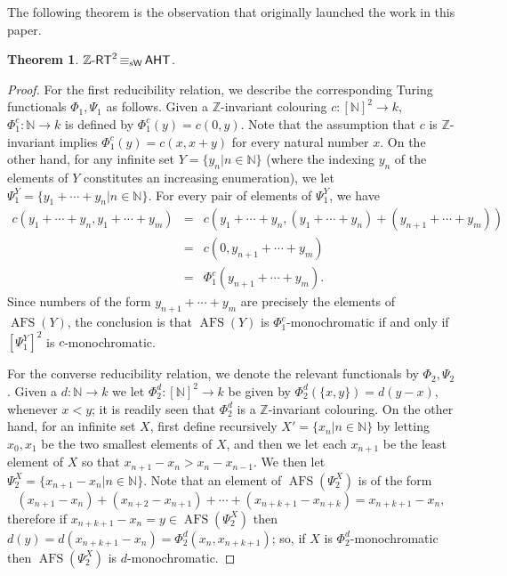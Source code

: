 \documentclass[11pt]{amsart}
\newcommand{\zrt}{\mathnormal{\mathbb Z\text{-}\mathsf{RT}}}
\newcommand{\aht}{\mathnormal{\mathsf{AHT}}}
\newcommand{\weiseq}{\mathop{\equiv_{\mathrm{s}\mathsf{W}}}}
\DeclareMathOperator{\afs}{AFS}
\newtheorem{theorem}{Theorem}%
\theoremstyle{definition}
\begin{document}
The following theorem is the observation that originally launched the work in this paper.

\begin{theorem}\label{zrtversusaht}
$\zrt^2\weiseq\aht$.
\end{theorem}

\begin{proof}
For the first reducibility relation, we describe the corresponding Turing functionals $\Phi_1,\Psi_1$ as follows.
Given a $\mathbb Z$-invariant colouring $c:[\mathbb N]^2\longrightarrow k$, $\Phi_1^c:\mathbb N\longrightarrow k$ is defined by $\Phi_1^c(y)=c(0,y)$. Note that the assumption that $c$ is $\mathbb Z$-invariant implies $\Phi_1^c(y)=c(x,x+y)$ for every natural number $x$. On the other hand, for any infinite set $Y=\{y_n\big|n\in\mathbb N\}$ (where the indexing $y_n$ of the elements of $Y$ constitutes an increasing enumeration), we let $\Psi_1^Y=\{y_1+\cdots+y_n\big|n\in\mathbb N\}$. For every pair of elements of $\Psi_1^Y$, we have
\begin{eqnarray*}
c(y_1+\cdots+y_n,y_1+\cdots+y_m) & = & c(y_1+\cdots+y_n,(y_1+\cdots+y_n)+(y_{n+1}+\cdots+y_m)) \\
 & = & c(0,y_{n+1}+\cdots+y_m) \\
 & = & \Phi_1^c(y_{n+1}+\cdots+y_m).
\end{eqnarray*}
Since numbers of the form $y_{n+1}+\cdots+y_m$ are precisely the elements of $\afs(Y)$, the conclusion is that $\afs(Y)$ is $\Phi_1^c$-monochromatic if and only if $[\Psi_1^Y]^2$ is $c$-monochromatic.

For the converse reducibility relation, we denote the relevant functionals by $\Phi_2,\Psi_2$. Given a $d:\mathbb N\longrightarrow k$ we let $\Phi_2^d:[\mathbb N]^2\longrightarrow k$ be given by $\Phi_2^d(\{x,y\})=d(y-x)$, whenever $x<y$; it is readily seen that $\Phi_2^d$ is a $\mathbb Z$-invariant colouring. On the other hand, for an infinite set $X$, first define recursively $X'=\{x_n\big|n\in\mathbb N\}$ by letting $x_0,x_1$ be the two smallest elements of $X$, and then we let each $x_{n+1}$ be the least element of $X$ so that $x_{n+1}-x_n>x_n-x_{n-1}$. We then let $\Psi_2^X=\{x_{n+1}-x_n\big|n\in\mathbb N\}$. Note that an element of $\afs(\Psi_2^X)$ is of the form
\begin{equation*}
(x_{n+1}-x_n)+(x_{n+2}-x_{n+1})+\cdots+(x_{n+k+1}-x_{n+k})=x_{n+k+1}-x_n,
\end{equation*}
therefore if $x_{n+k+1}-x_n=y\in\afs(\Psi_2^X)$ then $d(y)=d(x_{n+k+1}-x_n)=\Phi_2^d(x_n,x_{n+k+1})$; so, if $X$ is $\Phi_2^d$-monochromatic then $\afs(\Psi_2^X)$ is $d$-monochromatic.
\end{proof}
\end{document}

